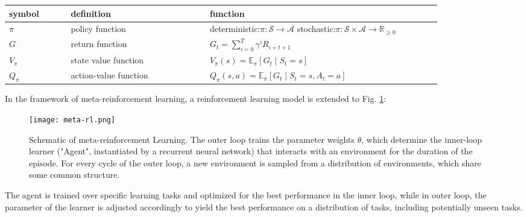 \begin{center}
	\begin{tabular}{| p{0.12\linewidth} | p{0.27\linewidth} | p{0.45\linewidth} |}
		\hline
		\textbf{symbol} & \textbf{definition} & \textbf{function} \\
		\hline
		$\pi$ & policy function & deterministic:\newline $\pi: \mathcal{S} \rightarrow \mathcal{A}$ \newline stochastic:\newline $\pi: \mathcal{S} \times \mathcal{A} \rightarrow \mathbb{R}_{\geq 0}$\\ 
		\hline
		$G$ & return function & $G_{t} = \sum_{i=0}^{T}\gamma^i R_{i+t+1}$ \\ 
		\hline 
		$V_{\pi}$ & state value function & $V_{\pi}(s)=\mathbb{E}_{\pi}\left[G_{t} \mid S_{t}=s\right]$\\
		\hline 
		$Q_{\pi}$ & action-value function & $Q_{\pi}(s, a)=\mathbb{E}_{\pi}\left[G_{t} \mid S_{t}=s, A_{t}=a\right]$ \\
		\hline 
	\end{tabular}
\end{center}

\par
In the framework of meta-reinforcement learning, a reinforcement learning model is extended to Fig. \ref{meta-model}:

\begin{figure}
	\texttt{[image: meta-rl.png]}
	\centering
	\caption{Schematic of meta-reinforcement Learning. The outer loop trains the parameter weights $\theta$, which determine the inner-loop learner ("Agent", instantiated by a recurrent neural network) that interacts with an environment for the duration of the episode. For every cycle of the outer loop, a new environment is sampled from a distribution of environments, which share some common structure\cite{meta-model}.}
	\label{meta-model}
\end{figure}

The agent is trained over specific learning tasks and optimized for the best performance in the inner loop, while in outer loop, the parameter of the learner is adjusted accordingly to yield the best performance on a distribution of tasks, including potentially unseen tasks.